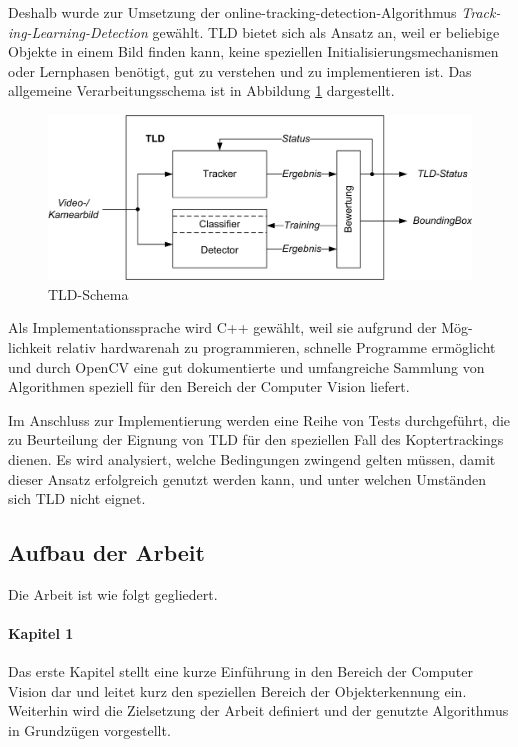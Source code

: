 Deshalb wurde zur Umsetzung der online-tracking-detection-Algorithmus \textit{Track-ing-Learning-Detection} \cite{TLD} gewählt. TLD bietet sich als Ansatz an, weil er beliebige Objekte in einem Bild finden kann, keine speziellen Initialisierungsmechanismen oder Lernphasen benötigt, gut zu verstehen und zu implementieren ist. Das allgemeine Verarbeitungsschema ist in Abbildung \ref{TLD-Schema} dargestellt.

\begin{figure}
\centering{}\includegraphics[scale=0.75]{../pictures/TLD-Framework.jpg}\caption{TLD-Schema}
\label{TLD-Schema}
\end{figure}

Als Implementationssprache wird C++ gewählt, weil sie aufgrund der Mög-lichkeit relativ hardwarenah zu programmieren, schnelle Programme ermöglicht und durch OpenCV \cite{OCV} eine gut dokumentierte und umfangreiche Sammlung von Algorithmen speziell für den Bereich der Computer Vision liefert.

Im Anschluss zur Implementierung werden eine Reihe von Tests durchgeführt, die zu Beurteilung der Eignung von TLD für den speziellen Fall des Koptertrackings dienen. Es wird analysiert, welche Bedingungen zwingend gelten müssen, damit dieser Ansatz erfolgreich genutzt werden kann, und unter welchen Umständen sich TLD nicht eignet.


\subsection{Aufbau der Arbeit}
Die Arbeit ist wie folgt gegliedert.

\paragraph{Kapitel 1}
Das erste Kapitel stellt eine kurze Einführung in den Bereich der Computer Vision dar und leitet kurz den speziellen Bereich der Objekterkennung ein. Weiterhin wird die Zielsetzung der Arbeit definiert und der genutzte Algorithmus in Grundzügen vorgestellt.

